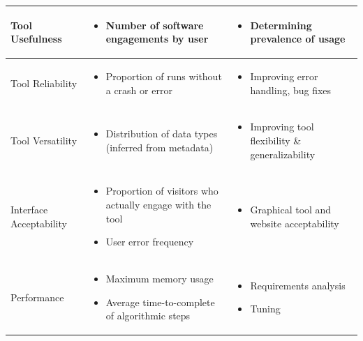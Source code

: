 \documentclass{article}
\begin{document}
\begin{table}[!ht]
\begin{tabular}{|p{}|p{}|p{}|}
    \hline
    Tool Usefulness & \raggedright{
    \begin{itemize}
         \item Number of software engagements by user
    \end{itemize} 
    } &
    \begin{itemize}
         \item Determining prevalence of usage
    \end{itemize} \\
    \hline
    Tool Reliability & 
    \begin{itemize}
         \item Proportion of runs without a crash or error
    \end{itemize}  &
    \begin{itemize}
        \item Improving error handling, bug fixes 
    \end{itemize} \\
    \hline
    Tool Versatility &
        \begin{itemize}
        \item Distribution of data types (inferred from metadata) 
        \end{itemize} &
        \begin{itemize}
        \item Improving tool flexibility \& generalizability
        \end{itemize}\\
    \hline
    Interface Acceptability &
    \begin{itemize}
        \item Proportion of visitors who actually engage with the tool
        \item User error frequency
    \end{itemize} &
    \begin{itemize}
        \item Graphical tool and website acceptability
        \end{itemize}\\
    \hline
    Performance &
    \begin{itemize}
        \item Maximum memory usage
        \item Average time-to-complete of algorithmic steps 
    \end{itemize} &
    \begin{itemize}
        \item{Requirements analysis}
        \item{Tuning}
    \end{itemize}\\
    \hline
  \end{tabular}
  \label{tab:metrics_table}
\end{table}
\end{document}

